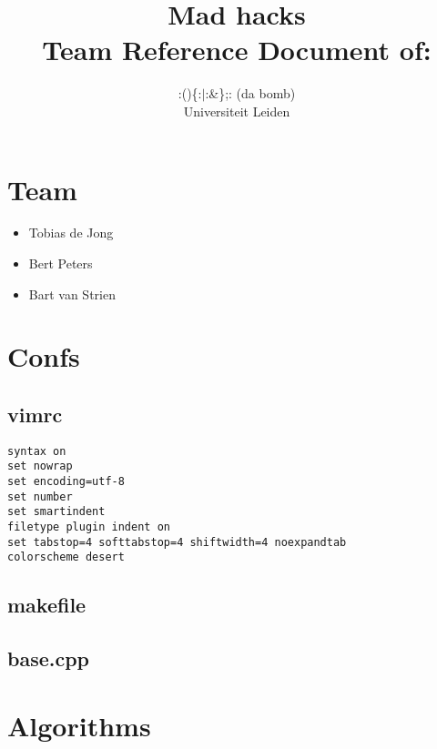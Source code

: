 \documentclass[10pt]{article}
\title{Mad hacks\\[1cm]
\small{Team Reference Document of:}}
\author{:()\{:$\vert$:\&\};: (da bomb)\\[1cm]
	\small{Universiteit Leiden}}
\begin{document}
\fontsize{10}{12}


\maketitle
\newpage
\section{Team}
\begin{itemize}
\item Tobias de Jong
\item Bert Peters
\item Bart van Strien
\end{itemize}

\section{Confs}
\subsection{vimrc}
\begin{lstlisting}
syntax on
set nowrap
set encoding=utf-8
set number
set smartindent
filetype plugin indent on
set tabstop=4 softtabstop=4 shiftwidth=4 noexpandtab
colorscheme desert
\end{lstlisting}

\subsection{makefile}


\lstset{language=c++}

\subsection{base.cpp}


\section{Algorithms}
\end{document}
